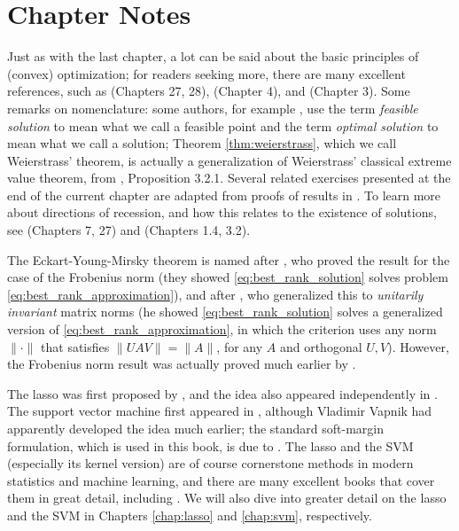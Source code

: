 \SkipTocEntry\section*{Chapter Notes}

Just as with the last chapter, a lot can be said about the basic principles of
(convex) optimization; for readers seeking more, there are many excellent
references, such as \cite{rockafellar1970convex} (Chapters 27, 28),
\cite{boyd2004convex} (Chapter 4), and \cite{bertsekas2009convex} (Chapter 3).
Some remarks on nomenclature: some authors, for example
\cite{rockafellar1970convex, bertsekas2009convex}, use the term \emph{feasible
solution} to mean what we call a feasible point and the term \emph{optimal
solution} to mean what we call a solution; Theorem \ref{thm:weierstrass}, which
we call Weierstrass' theorem, is actually a generalization of Weierstrass'
classical extreme value theorem, from \cite{bertsekas2009convex}, Proposition
3.2.1. Several related exercises presented at the end of the current chapter are
adapted from proofs of results in \cite{bertsekas2009convex}. To learn more
about directions of recession, and how this relates to the existence of
solutions, see \cite{rockafellar1970convex} (Chapters 7, 27) and
\cite{bertsekas2009convex} (Chapters 1.4, 3.2).

The Eckart-Young-Mirsky theorem is named after \cite{eckart1936approximation},
who proved the result for the case of the Frobenius norm (they showed
\eqref{eq:best_rank_solution} solves problem
\eqref{eq:best_rank_approximation}), and after \cite{mirsky1960symmetric}, who
generalized this to \emph{unitarily invariant} matrix norms (he showed
\eqref{eq:best_rank_solution} solves a generalized version of
\eqref{eq:best_rank_approximation}, in which the criterion uses any norm  
$\|\cdot\|$ that satisfies $\|U A V\| = \|A\|$, for any $A$ and orthogonal
$U,V$). However, the Frobenius norm result was actually proved much earlier by
\cite{schmidt1907theorie}. 

The lasso was first proposed by \cite{tibshirani1996regression}, and the idea
also appeared independently in \cite{chen1998atomic}. The support vector machine
first appeared in \cite{boser1992training}, although Vladimir Vapnik had
apparently developed the idea much earlier; the standard soft-margin
formulation, which is used in this book, is due to \cite{cortes1995support}. The
lasso and the SVM (especially its kernel version) are of course cornerstone
methods in modern statistics and machine learning, and there are many excellent
books that cover them in great detail, including \cite{hastie2009elements,
  scholkopf2002learning, hastie2015statistical}. We will also dive into greater
detail on the lasso and the SVM in Chapters \ref{chap:lasso} and \ref{chap:svm},
respectively.   

